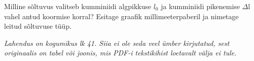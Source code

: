 
Milline sõltuvus valitseb kumminiidi algpikkuse $l_0$ ja kumminiidi pikenemise $\Delta$l vahel antud koormise korral? Esitage graafik millimeeterpaberil ja nimetage leitud sõltuvuse tüüp.

\hint

\solu
\textit{Lahendus on kogumikus lk 41. Siia ei ole seda veel ümber kirjutatud, sest originaalis on tabel või joonis, mis PDF-i tekstikihist loetavalt välja ei tule.}
\probend

